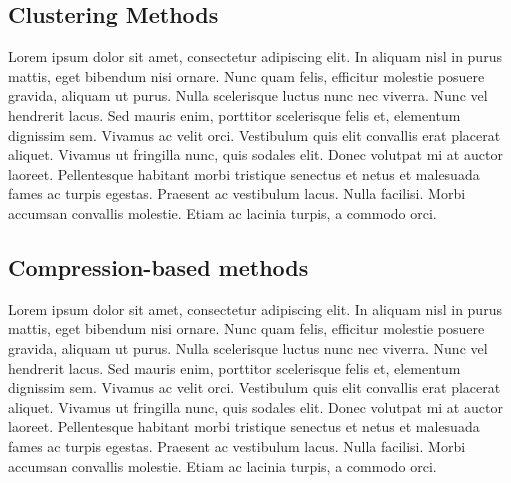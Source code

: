 \subsection{Clustering Methods}\label{sec:3.3.2}
\vspace{-0.5cm}
\noindent  Lorem ipsum dolor sit amet, consectetur adipiscing elit. In aliquam nisl in purus mattis, eget bibendum nisi ornare. Nunc quam felis, efficitur molestie posuere gravida, aliquam ut purus. Nulla scelerisque luctus nunc nec viverra. Nunc vel hendrerit lacus. Sed mauris enim, porttitor scelerisque felis et, elementum dignissim sem. Vivamus ac velit orci. Vestibulum quis elit convallis erat placerat aliquet. Vivamus ut fringilla nunc, quis sodales elit. Donec volutpat mi at auctor laoreet. Pellentesque habitant morbi tristique senectus et netus et malesuada fames ac turpis egestas. Praesent ac vestibulum lacus. Nulla facilisi. Morbi accumsan convallis molestie. Etiam ac lacinia turpis, a commodo orci.

\vspace{-0.3cm}

\subsection{Compression-based methods}\label{sec:3.3.3}
\vspace{-0.5cm}
\noindent  Lorem ipsum dolor sit amet, consectetur adipiscing elit. In aliquam nisl in purus mattis, eget bibendum nisi ornare. Nunc quam felis, efficitur molestie posuere gravida, aliquam ut purus. Nulla scelerisque luctus nunc nec viverra. Nunc vel hendrerit lacus. Sed mauris enim, porttitor scelerisque felis et, elementum dignissim sem. Vivamus ac velit orci. Vestibulum quis elit convallis erat placerat aliquet. Vivamus ut fringilla nunc, quis sodales elit. Donec volutpat mi at auctor laoreet. Pellentesque habitant morbi tristique senectus et netus et malesuada fames ac turpis egestas. Praesent ac vestibulum lacus. Nulla facilisi. Morbi accumsan convallis molestie. Etiam ac lacinia turpis, a commodo orci.

\vspace{-0.3cm}

